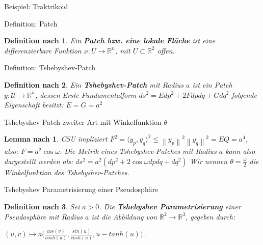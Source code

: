 \documentclass[12pt]{beamer}
\newtheorem{mydef}{Definition nach \cite{gray}}
\newtheorem{mylem}{Lemma nach \cite{gray}}
\newcommand{\norm}[1]{\left\lVert#1\right\rVert}
\begin{document}
\begin{frame}{Beispiel: Traktrikoid}
\begin{figure}
\end{figure}

\end{frame}

\begin{frame}{Definition: Patch}
\begin{mydef}
Ein \textbf{Patch bzw. eine lokale Fläche} ist eine differenzierbare Funktion $x: U \rightarrow \mathbb{R}^n$, mit $U \subset \mathbb{R}^2$ offen. 
\end{mydef}
\end{frame}

\begin{frame}{Definition: Tshebyshev-Patch}
\begin{mydef}
Ein \textbf{Tshebyshev-Patch} mit Radius $a$ ist ein Patch $y: \mathcal{U}\rightarrow \mathbb{R}^n$, dessen Erste Fundamentalform $ds^2 = Edp^2 + 2Fdpdq + Gdq^2$ folgende Eigenschaft besitzt:\newline
$E = G = a^2$
\end{mydef}
\end{frame}

\begin{frame}{Tshebyshev-Patch zweiter Art mit Winkelfunktion $\theta$}
\begin{mylem}
CSU impliziert \newline
$F^2 = \langle y_p,y_q\rangle^2 \leq \norm{y_p}^2 \norm{y_q}^2 = EQ = a^4$,
also: $F = a^2 \cos\omega$. Die Metrik eines Tshebyshev-Patches mit Radius $a$ kann also dargestellt werden als:\newline
$ds^2 = a^2(dp^2 + 2\cos\omega dpdq + dq^2)$\newline\newline
Wir nennen $\theta = \frac{\omega}{2}$ die Winkelfunktion des Tshebyshev-Patches.
\end{mylem}
\end{frame}

\begin{frame}{Tshebyshev Parametrisierung einer Pseudosphäre}
\begin{mydef}
Sei $a > 0$. Die \textbf{Tshebyshev Parametrisierung} einer Pseudosphäre mit Radius $a$ ist die Abbildung von $\mathbb{R}^2 \rightarrow \mathbb{R}^3$, gegeben durch:
\begin{center}
$(u,v) \mapsto a\Big(\frac{cos(v)}{cosh(u)}, \frac{sin(u)}{cosh(u)}, u - tanh(u)\Big)$.
\end{center}
\end{mydef}
\end{frame}
\end{document}
